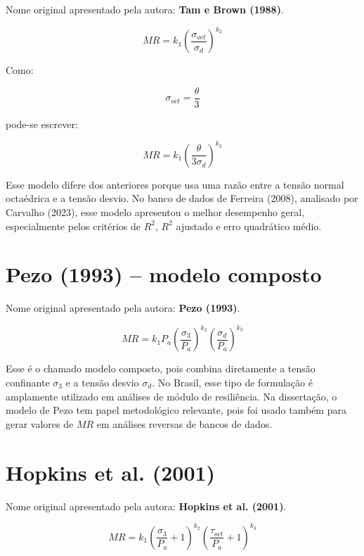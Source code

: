 \documentclass[12pt,a4paper]{article}
\begin{document}
Nome original apresentado pela autora: \textbf{Tam e Brown (1988)}.

\begin{equation}
MR=k_1\left(\frac{\sigma_{oct}}{\sigma_d}\right)^{k_2}
\end{equation}

Como:

\begin{equation}
\sigma_{oct}=\frac{\theta}{3}
\end{equation}

pode-se escrever:

\begin{equation}
MR=k_1\left(\frac{\theta}{3\sigma_d}\right)^{k_2}
\end{equation}

Esse modelo difere dos anteriores porque usa uma razão entre a tensão normal octaédrica e a tensão desvio. No banco de dados de Ferreira (2008), analisado por Carvalho (2023), esse modelo apresentou o melhor desempenho geral, especialmente pelos critérios de $R^2$, $R^2$ ajustado e erro quadrático médio.

\section{Pezo (1993) -- modelo composto}

Nome original apresentado pela autora: \textbf{Pezo (1993)}.

\begin{equation}
MR=k_1P_a
\left(\frac{\sigma_3}{P_a}\right)^{k_2}
\left(\frac{\sigma_d}{P_a}\right)^{k_3}
\end{equation}

Esse é o chamado modelo composto, pois combina diretamente a tensão confinante $\sigma_3$ e a tensão desvio $\sigma_d$. No Brasil, esse tipo de formulação é amplamente utilizado em análises de módulo de resiliência. Na dissertação, o modelo de Pezo tem papel metodológico relevante, pois foi usado também para gerar valores de $MR$ em análises reversas de bancos de dados.

\section{Hopkins et al. (2001)}

Nome original apresentado pela autora: \textbf{Hopkins et al. (2001)}.

\begin{equation}
MR=k_1
\left(\frac{\sigma_3}{P_a}+1\right)^{k_2}
\left(\frac{\tau_{oct}}{P_a}+1\right)^{k_3}
\end{equation}
\end{document}
